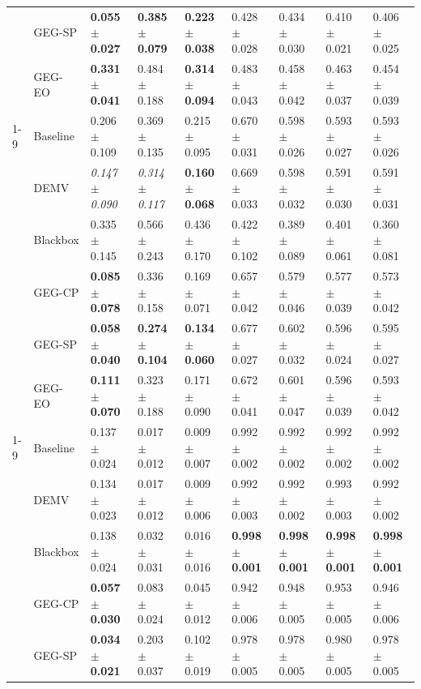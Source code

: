 \begin{table}
\begin{tabular}{lllllllll}
 & GEG-SP & \textbf{0.055 $\pm$ 0.027} & \textbf{0.385 $\pm$ 0.079} & \textbf{0.223 $\pm$ 0.038} & 0.428 $\pm$ 0.028 & 0.434 $\pm$ 0.030 & 0.410 $\pm$ 0.021 & 0.406 $\pm$ 0.025 \\
 & GEG-EO & \textbf{0.331 $\pm$ 0.041} & 0.484 $\pm$ 0.188 & \textbf{0.314 $\pm$ 0.094} & 0.483 $\pm$ 0.043 & 0.458 $\pm$ 0.042 & 0.463 $\pm$ 0.037 & 0.454 $\pm$ 0.039 \\
\cline{1-9}
\multirow[t]{6}{*}{drug} & Baseline & 0.206 $\pm$ 0.109 & 0.369 $\pm$ 0.135 & 0.215 $\pm$ 0.095 & 0.670 $\pm$ 0.031 & 0.598 $\pm$ 0.026 & 0.593 $\pm$ 0.027 & 0.593 $\pm$ 0.026 \\
 & DEMV & \textit{0.147 $\pm$ 0.090} & \textit{0.314 $\pm$ 0.117} & \textbf{0.160 $\pm$ 0.068} & 0.669 $\pm$ 0.033 & 0.598 $\pm$ 0.032 & 0.591 $\pm$ 0.030 & 0.591 $\pm$ 0.031 \\
 & Blackbox & 0.335 $\pm$ 0.145 & 0.566 $\pm$ 0.243 & 0.436 $\pm$ 0.170 & 0.422 $\pm$ 0.102 & 0.389 $\pm$ 0.089 & 0.401 $\pm$ 0.061 & 0.360 $\pm$ 0.081 \\
 & GEG-CP & \textbf{0.085 $\pm$ 0.078} & 0.336 $\pm$ 0.158 & 0.169 $\pm$ 0.071 & 0.657 $\pm$ 0.042 & 0.579 $\pm$ 0.046 & 0.577 $\pm$ 0.039 & 0.573 $\pm$ 0.042 \\
 & GEG-SP & \textbf{0.058 $\pm$ 0.040} & \textbf{0.274 $\pm$ 0.104} & \textbf{0.134 $\pm$ 0.060} & 0.677 $\pm$ 0.027 & 0.602 $\pm$ 0.032 & 0.596 $\pm$ 0.024 & 0.595 $\pm$ 0.027 \\
 & GEG-EO & \textbf{0.111 $\pm$ 0.070} & 0.323 $\pm$ 0.188 & 0.171 $\pm$ 0.090 & 0.672 $\pm$ 0.041 & 0.601 $\pm$ 0.047 & 0.596 $\pm$ 0.039 & 0.593 $\pm$ 0.042 \\
\cline{1-9}
\multirow[t]{6}{*}{law} & Baseline & 0.137 $\pm$ 0.024 & 0.017 $\pm$ 0.012 & 0.009 $\pm$ 0.007 & 0.992 $\pm$ 0.002 & 0.992 $\pm$ 0.002 & 0.992 $\pm$ 0.002 & 0.992 $\pm$ 0.002 \\
 & DEMV & 0.134 $\pm$ 0.023 & 0.017 $\pm$ 0.012 & 0.009 $\pm$ 0.006 & 0.992 $\pm$ 0.003 & 0.992 $\pm$ 0.002 & 0.993 $\pm$ 0.003 & 0.992 $\pm$ 0.002 \\
 & Blackbox & 0.138 $\pm$ 0.024 & 0.032 $\pm$ 0.031 & 0.016 $\pm$ 0.016 & \textbf{0.998 $\pm$ 0.001} & \textbf{0.998 $\pm$ 0.001} & \textbf{0.998 $\pm$ 0.001} & \textbf{0.998 $\pm$ 0.001} \\
 & GEG-CP & \textbf{0.057 $\pm$ 0.030} & 0.083 $\pm$ 0.024 & 0.045 $\pm$ 0.012 & 0.942 $\pm$ 0.006 & 0.948 $\pm$ 0.005 & 0.953 $\pm$ 0.005 & 0.946 $\pm$ 0.006 \\
 & GEG-SP & \textbf{0.034 $\pm$ 0.021} & 0.203 $\pm$ 0.037 & 0.102 $\pm$ 0.019 & 0.978 $\pm$ 0.005 & 0.978 $\pm$ 0.005 & 0.980 $\pm$ 0.005 & 0.978 $\pm$ 0.005 \\

\end{tabular}
\end{table}
